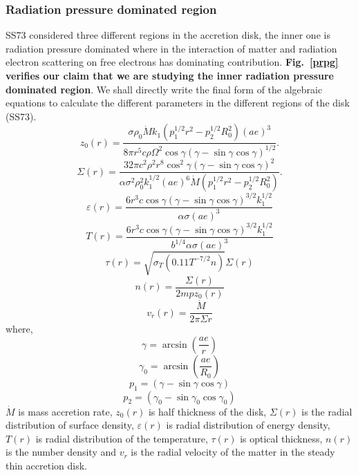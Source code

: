 \documentclass[useAMS,usenatbib]{mn2e}
\begin{document}
\subsubsection{Radiation pressure dominated region}
SS73 considered three different regions in the accretion disk, the inner one is radiation pressure dominated where in the interaction of matter and radiation electron scattering on free electrons has dominating contribution. \textbf{Fig.~\ref{prpg} verifies our claim that we are studying the inner radiation pressure dominated region}. We shall directly write the final form of the algebraic equations to calculate the different parameters in the different regions of the disk (SS73).
\begin{equation}
z_0(r) = \frac{\sigma\rho_0\dot{M}k_1\left(p_1^{1/2}r^2 - p_2^{1/2}R_0^2\right)(ae)^3}{8\pi r^5 c \rho \Omega^2\cos\gamma(\gamma - \sin\gamma\cos\gamma)^{1/2}}.
\end{equation}
\begin{equation}
\Sigma(r) = \frac{32\pi c^2\rho^2 r^8 \cos^2{\gamma}(\gamma - \sin\gamma\cos\gamma)^2}{\alpha\sigma^2\rho_0^2 k_1^{1/2}(ae)^6\dot{M}\left(p_1^{1/2}r^2 - p_2^{1/2}R_0^2\right)}.
\end{equation}
\begin{equation}
\varepsilon(r) = \frac{6 r^3 c \cos\gamma(\gamma - \sin\gamma\cos\gamma)^{3/2}k_1^{1/2}}{\alpha\sigma (ae)^3}
\end{equation}
\begin{equation}
T(r) = \frac{6r^3 c \cos\gamma (\gamma - \sin\gamma\cos\gamma)^{3/2}k_1^{1/2}}{b^{1/4}\alpha\sigma (ae)^3}
\end{equation}
\begin{equation}
\tau (r) = \sqrt{\sigma_T(0.11 T^{-7/2}n)}\Sigma(r)
\end{equation}
\begin{equation}
n(r) = \frac{\Sigma(r)}{2mpz_0(r)}
\end{equation}
\begin{equation}
v_r(r) = \frac{\dot{M}}{2\pi\Sigma r}
\end{equation}
where, 
\begin{equation} 
\gamma = \arcsin(\frac{ae}{r}) 
\end{equation}
\begin{equation}
\gamma_0 = \arcsin(\frac{ae}{R_0})
\end{equation}
\begin{equation}
p_1 = (\gamma - \sin\gamma\cos\gamma)
\end{equation}
\begin{equation}
p_2 = (\gamma_0 - \sin\gamma_0\cos\gamma_0)
\end{equation}
$\dot{M}$ is mass accretion rate, $z_0(r)$ is half thickness of the disk, $\Sigma(r)$ is the radial distribution of surface density, $\varepsilon(r)$ is radial distribution of energy density, $T(r)$ is radial distribution of the temperature, $\tau(r)$ is optical thickness, $n(r)$ is the number density and $v_r$ is the radial velocity of the matter in the steady thin accretion disk.
\end{document}
